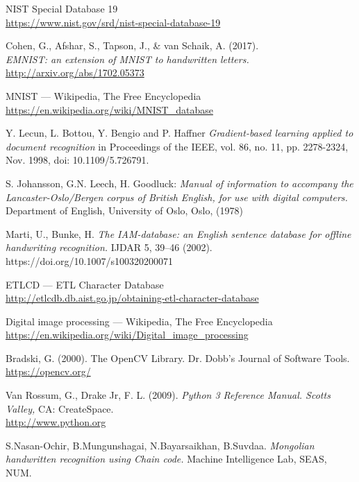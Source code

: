 \renewcommand\bibname{Ашигласан материал}
\begin{thebibliography}{99}
	NIST Special Database 19
	\\\url{https://www.nist.gov/srd/nist-special-database-19}

	Cohen, G., Afshar, S., Tapson, J., \& van Schaik, A. (2017).
	\\\textit{EMNIST: an extension of MNIST to handwritten letters.}
	\\\url{http://arxiv.org/abs/1702.05373}

	MNIST --- {W}ikipedia{,} The Free Encyclopedia
	\\\url{https://en.wikipedia.org/wiki/MNIST_database}

	Y. Lecun, L. Bottou, Y. Bengio and P. Haffner
	\textit{Gradient-based learning applied to document recognition} in Proceedings of the IEEE, vol. 86, no. 11, pp. 2278-2324, Nov. 1998, doi: 10.1109/5.726791.

	S. Johansson, G.N. Leech, H. Goodluck: \textit{Manual of information to accompany the Lancaster-Oslo/Bergen corpus of British English, for use with digital computers.} Department of English, University of Oslo, Oslo, (1978)

	Marti, U., Bunke, H. \textit{The IAM-database: an English sentence database for offline handwriting recognition.} IJDAR 5, 39–46 (2002). https://doi.org/10.1007/s100320200071

	ETLCD --- ETL Character Database
	\\\url{http://etlcdb.db.aist.go.jp/obtaining-etl-character-database}

	Digital image processing --- {W}ikipedia{,} The Free Encyclopedia
	\\\url{https://en.wikipedia.org/wiki/Digital_image_processing}

	Bradski, G. (2000). The OpenCV Library. Dr. Dobb's Journal of Software Tools.
	\\\url{https://opencv.org/}

	Van Rossum, G., Drake Jr, F. L. (2009). \textit{Python 3 Reference Manual. Scotts Valley,} CA: CreateSpace.
	\\\url{http://www.python.org}

	S.Nasan-Ochir, B.Mungunshagai, N.Bayarsaikhan, B.Suvdaa. \textit{Mongolian handwritten recognition using Chain code.} Machine Intelligence Lab, SEAS, NUM.

\end{thebibliography}
